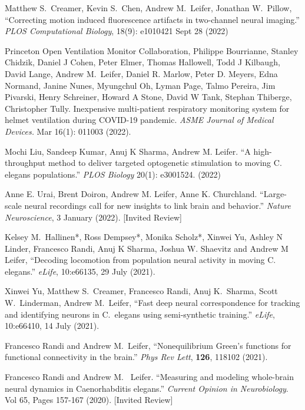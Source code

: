 \documentclass[11pt]{article}
\makeatletter
\newlength{\bibhang}
\newlength{\bibsep}
\newcounter{Lcount}
 {\@listi \global\bibsep\itemsep \global\advance\bibsep by\parsep}
\newenvironment{bibsection}%
        {\begin{list}{\arabic{Lcount}.}{%
       \usecounter{Lcount}%
       \setlength\labelwidth{-0.5em}%
       \setlength{\leftmargin}{\bibhang}%
       \setlength{\itemindent}{-\leftmargin}%
       \setlength{\itemsep}{\bibsep}%
       \setlength{\parsep}{\z@}%
        \setlength{\partopsep}{0pt}%
        \setlength{\topsep}{0pt}}}
        {\end{list}\vspace{-.6\baselineskip}}
\makeatother
\begin{document}
\begin{bibsection}
\item Matthew S.~Creamer, Kevin S.~Chen, Andrew M.~Leifer, Jonathan W.~Pillow, ``Correcting motion induced fluorescence artifacts in two-channel neural imaging.'' \textit{PLOS Computational Biology},  18(9): e1010421  Sept 28 (2022)

\item Princeton Open Ventilation Monitor Collaboration, Philippe Bourrianne, Stanley Chidzik, Daniel J Cohen, Peter Elmer, Thomas Hallowell, Todd J Kilbaugh, David Lange, Andrew M.~Leifer, Daniel R. Marlow, Peter D. Meyers, Edna Normand, Janine Nunes, Myungchul Oh, Lyman Page, Talmo Pereira, Jim Pivarski, Henry Schreiner, Howard A Stone, David W Tank, Stephan Thiberge, Christopher Tully.  Inexpensive multi-patient respiratory monitoring system for helmet ventilation during COVID-19 pandemic. \textit{ASME Journal of Medical Devices.}  Mar 16(1): 011003 (2022).

\item Mochi Liu, Sandeep Kumar, Anuj K Sharma, Andrew M. Leifer. ``A high-throughput method to deliver targeted optogenetic stimulation to moving C. elegans populations.'' \textit{PLOS Biology} 20(1): e3001524. (2022)



\item Anne E. Urai, Brent Doiron, Andrew M. Leifer, Anne K. Churchland. ``Large-scale neural recordings call for new insights to link brain and behavior.'' \textit{Nature Neuroscience}, 3 January (2022). [Invited Review]


\item Kelsey M.~Hallinen*, Ross Dempsey*, Monika Scholz*, Xinwei Yu, Ashley N Linder, Francesco Randi, Anuj K Sharma, Joshua W. Shaevitz and Andrew M Leifer, ``Decoding locomotion from population neural activity in moving C. elegans.'' \emph{eLife}, 10:e66135, 29 July (2021).

\item Xinwei Yu, Matthew S.~Creamer, Francesco Randi, Anuj K.~Sharma, Scott W.~Linderman, Andrew M.~Leifer, ``Fast deep neural correspondence for  tracking and identifying neurons in C.~elegans using semi-synthetic training.'' \emph{eLife}, 10:e66410, 14 July (2021).

\item Francesco Randi and Andrew M.~Leifer, ``Nonequilibrium Green's functions for functional connectivity in the brain.'' \emph{Phys Rev Lett}, \textbf{126}, 118102 (2021).

\item Francesco Randi and Andrew M.~ Leifer. ``Measuring and modeling whole-brain neural dynamics in Caenorhabditis elegans.'' \emph{Current Opinion in Neurobiology}. Vol 65, Pages 157-167 (2020). [Invited Review]


\end{bibsection}
\end{document}
